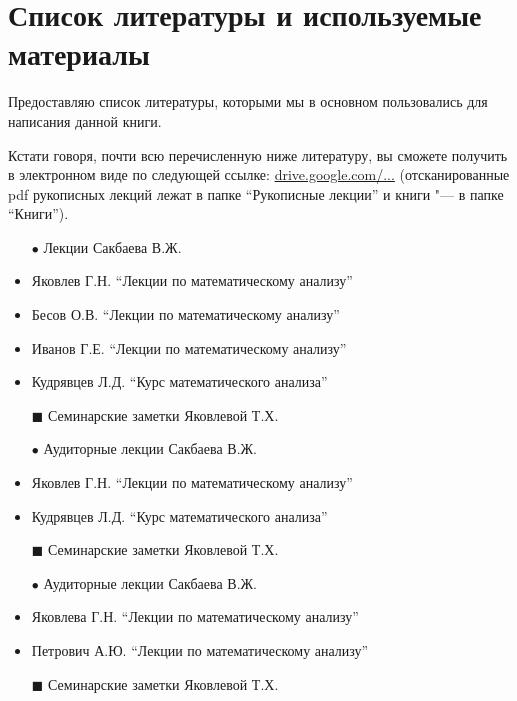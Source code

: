 \chapter{Список литературы и используемые материалы}

Предоставляю список литературы, которыми мы в основном пользовались для написания данной книги. 

Кстати говоря, почти всю перечисленную ниже литературу, вы сможете получить в электронном виде по следующей ссылке: \href{https://drive.google.com/drive/u/0/folders/0BzuzEyNkpwYDcENXcV9jNWdwVlU}{drive.google.com/...} (отсканированные pdf рукописных лекций лежат в папке ``Рукописные лекции'' и книги "--- в папке ``Книги'').


\begin{itemize}[wide,  labelwidth=!, noitemsep, label=$\blacktriangleright$, labelindent = 0pt]
\item[$\bullet$]
Лекции Сакбаева В.Ж.
\item
Яковлев Г.Н. ``Лекции по математическому анализу'' 
\item
Бесов О.В. ``Лекции по математическому анализу''
\item
Иванов Г.Е. ``Лекции по математическому анализу'' 
\item 
Кудрявцев Л.Д. ``Курс математического анализа''
\item[$\blacksquare$]
Семинарские заметки Яковлевой Т.Х.
\end{itemize}

\begin{itemize}[wide,  labelwidth=!, noitemsep, label=$\blacktriangleright$, labelindent = 0pt]
\item[$\bullet$]
Аудиторные лекции Сакбаева В.Ж.
\item
Яковлев Г.Н. ``Лекции по математическому анализу''
\item 
Кудрявцев Л.Д. ``Курс математического анализа''
\item[$\blacksquare$]
Семинарские заметки Яковлевой Т.Х.
\end{itemize}

\begin{itemize}[wide,  labelwidth=!, noitemsep, label=$\blacktriangleright$, labelindent = 0pt]
\item[$\bullet$]
Аудиторные лекции Сакбаева В.Ж.
\item
Яковлева Г.Н. ``Лекции по математическому анализу'' 
\item
Петрович А.Ю. ``Лекции по математическому анализу''
\item[$\blacksquare$]
Семинарские заметки Яковлевой Т.Х.
\end{itemize}


